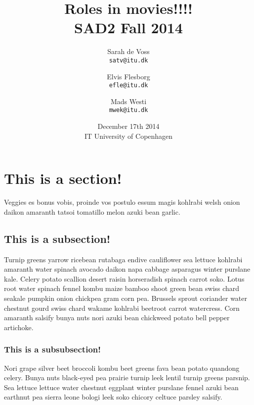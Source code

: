\documentclass[a4paper,11pt]{article}
\begin{document}
\date{December 17th 2014\\ IT University of Copenhagen}
\title{Roles in movies!!!!\\SAD2 Fall 2014}

\author{Sarah de Voss\\
\texttt{satv@itu.dk}
\and Elvis Flesborg\\
\texttt{efle@itu.dk}
\and Mads Westi\\
\texttt{mwek@itu.dk}}
\clearpage\maketitle
\newpage
\thispagestyle{empty}
\setcounter{page}{1}
\tableofcontents
\newpage
\section{This is a section!}
Veggies es bonus vobis, proinde vos postulo essum magis kohlrabi welsh onion daikon amaranth tatsoi tomatillo melon azuki bean garlic. \\

\subsection{This is a subsection!}
Turnip greens yarrow ricebean rutabaga endive cauliflower sea lettuce kohlrabi amaranth water spinach avocado daikon napa cabbage asparagus winter purslane kale. Celery potato scallion desert raisin horseradish spinach carrot soko. Lotus root water spinach fennel kombu maize bamboo shoot green bean swiss chard seakale pumpkin onion chickpea gram corn pea. Brussels sprout coriander water chestnut gourd swiss chard wakame kohlrabi beetroot carrot watercress. Corn amaranth salsify bunya nuts nori azuki bean chickweed potato bell pepper artichoke. \\

\subsubsection{This is a subsubsection!}
Nori grape silver beet broccoli kombu beet greens fava bean potato quandong celery. Bunya nuts black-eyed pea prairie turnip leek lentil turnip greens parsnip. Sea lettuce lettuce water chestnut eggplant winter purslane fennel azuki bean earthnut pea sierra leone bologi leek soko chicory celtuce parsley salsify. \\
\end{document}
